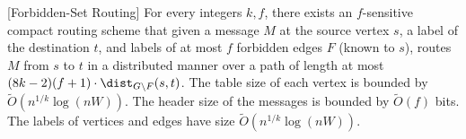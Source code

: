 \begin{theorem}\label{thm:routing-known}[Forbidden-Set Routing]
For every integers $k,f$, there exists an $f$-sensitive compact routing scheme that given a message $M$ at the source vertex $s$, a label of the destination $t$, and labels of at most $f$ forbidden edges $F$ (known to $s$), routes $M$ from $s$ to $t$ in a distributed manner over a path of length at most $(8k-2)(f+1)\cdot \dist_{G \setminus F}(s,t)$. The table size of each vertex is bounded by $\widetilde{O}(n^{1/k} \log{(nW)})$. The header size of the messages is bounded by $\widetilde{O}(f)$ bits. The labels of vertices and edges have size $\widetilde{O}(n^{1/k} \log{(nW)})$.
\end{theorem}


